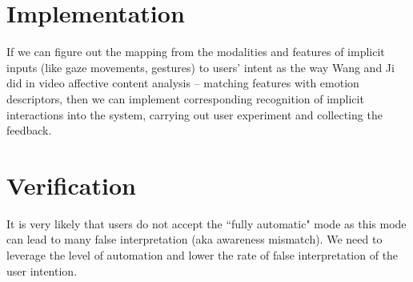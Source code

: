 \documentclass[fyp]{socreport}
\begin{document}
\section{Implementation}
If we can figure out the mapping from the modalities and features of implicit inputs (like gaze movements, gestures) to users' intent as the way Wang and Ji \cite{wang2015video} did in video affective content analysis -- matching features with emotion descriptors, then we can implement corresponding recognition of implicit interactions into the system, carrying out user experiment and collecting the feedback.

\section{Verification}
It is very likely that users do not accept the ``fully automatic" mode as this mode can lead to many false interpretation (aka awareness mismatch). We need to leverage the level of automation and lower the rate of false interpretation of the user intention.



\end{document}

